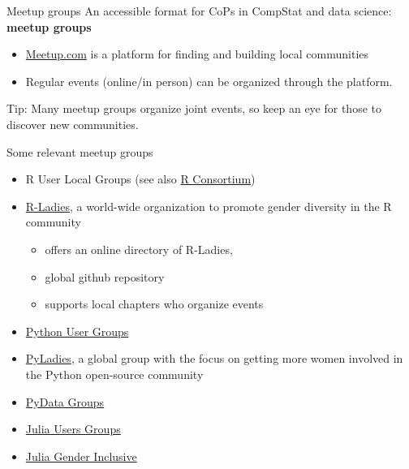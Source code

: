 \documentclass[
  ignorenonframetext,
]{beamer}
\providecommand{\tightlist}{%
  \setlength{\itemsep}{0pt}\setlength{\parskip}{0pt}}
\begin{document}
\begin{frame}{Meetup groups}
\protect\hypertarget{meetup-groups}{}
An accessible format for CoPs in CompStat and data science:
\textbf{meetup groups}

\begin{itemize}
\item
  \href{https://meetup.com}{Meetup.com} is a platform for finding and
  building local communities
\item
  Regular events (online/in person) can be organized through the
  platform.
\end{itemize}

Tip: Many meetup groups organize joint events, so keep an eye for those
to discover new communities.
\end{frame}

\begin{frame}{Some relevant meetup groups}
\protect\hypertarget{some-relevant-meetup-groups}{}
\begin{itemize}
\item
  R User Local Groups (see also
  \href{https://www.r-consortium.org/all-projects/r-user-group-support-program}{R
  Consortium})
\item
  \href{https://rladies.org/}{R-Ladies}, a world-wide organization to
  promote gender diversity in the R community

  \begin{itemize}
  \tightlist
  \item
    offers an online directory of R-Ladies,
  \item
    global github repository
  \item
    supports local chapters who organize events
  \end{itemize}
\item
  \href{https://wiki.python.org/moin/LocalUserGroups}{Python User
  Groups}
\item
  \href{https://pyladies.com/}{PyLadies}, a global group with the focus
  on getting more women involved in the Python open-source community
\item
  \href{https://www.meetup.com/de-DE/pro/pydata/}{PyData Groups}
\item
  \href{https://www.meetup.com/de-DE/topics/julia/all/?all=1}{Julia
  Users Groups}
\item
  \href{https://discourse.julialang.org/t/announcing-julia-gender-inclusive/63702}{Julia
  Gender Inclusive}
\end{itemize}
\end{frame}
\end{document}
